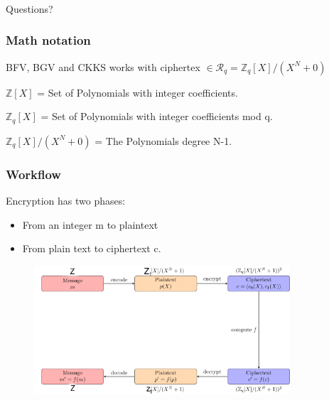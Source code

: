 \documentclass[10pt,handout]{beamer}
\begin{document}
\begin{frame}
\frametitle{}
\Huge

\begin{center}
   Questions?
\end{center}
\end{frame}




\begin{frame}[noframenumbering]
\frametitle{Math notation}
BFV, BGV and CKKS works with ciphertex  $\in \mathcal{R}_q =\mathbb{Z}_q[X]/(X^N+0)$

$\mathbb{Z}[X]$ = Set of Polynomials with integer coefficients.

$\mathbb{Z}_q[X]$ = Set of Polynomials with integer coefficients mod q.

$\mathbb{Z}_q[X]/(X^N+0)$ = The Polynomials degree N-1.


\end{frame}

\begin{frame}[noframenumbering]
\frametitle{Workflow}

    Encryption has two phases:
\begin{itemize}
    \item From an integer m to plaintext
    \item From plain text to ciphertext c.
\end{itemize}


\begin{figure}
    \includegraphics[width=0.85\textwidth]{bfv-diagram.png}
\end{figure}


\end{frame}
\end{document}
